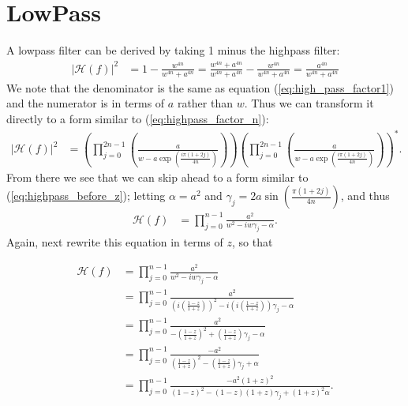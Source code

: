 \documentclass[a4paper]{article}
\begin{document}
\section{LowPass}
A lowpass filter can be derived by taking 1 minus the highpass filter:
\begin{align}
    |\mathcal{H}(f)|^2 &= 1 - \frac{w^{4n}}{w^{4n} + a^{4n}} = \frac{w^{4n} + a^{4n}}{w^{4n} + a^{4n}} - \frac{w^{4n}}{w^{4n} + a^{4n}} =  \frac{a^{4n}}{w^{4n} + a^{4n}} 
\end{align}
We note that the denominator is the same as equation (\ref{eq:high_pass_factor1}) and the numerator is in terms of $a$ rather than $w$. Thus we can transform it directly to a form similar to (\ref{eq:highpass_factor_n}):
\begin{align}
    |\mathcal{H}(f)|^2 
                           &= \left(\prod_{j=0}^{2 n - 1} \left(\frac{a}{w - a\exp\left(\frac{i \pi (1 + 2 j)}{4 n}\right)}\right)\right)
                          \left(\prod_{j=0}^{2 n - 1} \left(\frac{a}{w - a\exp\left(\frac{i \pi (1 + 2 j)}{4 n}\right)}\right)\right)^{*}\label{eq:lowpass_factor_n}.
\end{align}
From there we see that we can skip ahead to a form similar to (\ref{eq:highpass_before_z}); letting $\alpha = a^2$ and $\gamma_j = 2 a \sin\left(\frac{\pi (1 + 2 j)}{4 n}\right)$, and thus 
\begin{align}
    \mathcal{H}(f) &= \prod_{j=0}^{n - 1}\frac{a^2}
        {w^2 - i w \gamma_j - \alpha}\label{eq:lowpass_before_z}.
\end{align}
Again, next rewrite this equation in terms of $z$, so that

\begin{align}
    \mathcal{H}(f) &= \prod_{j=0}^{n - 1}\frac{a^2}
        {w^2 - i w \gamma_j - \alpha} \\
    &= \prod_{j=0}^{n - 1}\frac{a^2}
        {\left(i\left(\frac{1 - z}{1 + z}\right)\right)^2 - i \left(i\left(\frac{1 - z}{1 + z}\right)\right) \gamma_j - \alpha} \\
    &= \prod_{j=0}^{n - 1}\frac{a^2}
        {-\left(\frac{1 - z}{1 + z}\right)^2 +  \left(\frac{1 - z}{1 + z}\right) \gamma_j - \alpha} \\
    &= \prod_{j=0}^{n - 1}\frac{-a^2}
        {\left(\frac{1 - z}{1 + z}\right)^2 -  \left(\frac{1 - z}{1 + z}\right) \gamma_j +  \alpha} \\
    &= \prod_{j=0}^{n - 1}\frac{-a^2(1 + z)^2}
        {(1 - z)^2 - (1 - z)(1 + z) \gamma_j + (1 + z)^2 \alpha}.
\end{align}
\end{document}

